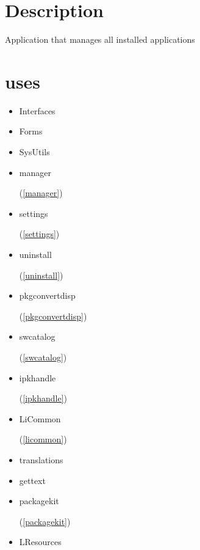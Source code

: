 \documentclass{report}
\begin{document}
\section{Description}
Application that manages all installed applications
\section{uses}
\begin{itemize}
\item \begin{ttfamily}Interfaces\end{ttfamily}\item \begin{ttfamily}Forms\end{ttfamily}\item \begin{ttfamily}SysUtils\end{ttfamily}\item \begin{ttfamily}manager\end{ttfamily}(\ref{manager})\item \begin{ttfamily}settings\end{ttfamily}(\ref{settings})\item \begin{ttfamily}uninstall\end{ttfamily}(\ref{uninstall})\item \begin{ttfamily}pkgconvertdisp\end{ttfamily}(\ref{pkgconvertdisp})\item \begin{ttfamily}swcatalog\end{ttfamily}(\ref{swcatalog})\item \begin{ttfamily}ipkhandle\end{ttfamily}(\ref{ipkhandle})\item \begin{ttfamily}LiCommon\end{ttfamily}(\ref{licommon})\item \begin{ttfamily}translations\end{ttfamily}\item \begin{ttfamily}gettext\end{ttfamily}\item \begin{ttfamily}packagekit\end{ttfamily}(\ref{packagekit})\item \begin{ttfamily}LResources\end{ttfamily}\end{itemize}
\end{document}
